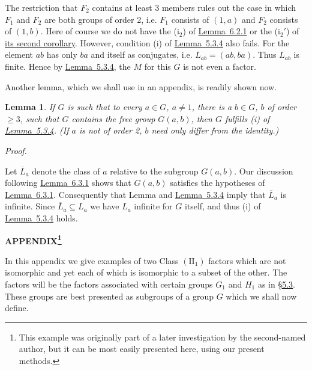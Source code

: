 \documentclass[b5paper,twoside]{article}
\makeatletter
\newcommand{\MvNSetCurrentLabel}[2]{%
  \edef\@currentlabel{#1}%
  \edef\@currentlabelname{#2}%
}
\newcommand{\MvNTargetLabel}[3]{%
  \phantomsection
  \begingroup
    \MvNSetCurrentLabel{#2}{#3}%
    \label{#1}%
  \endgroup
}
\newcommand{\secref}[2]{\hyperref[#1]{\mbox{\S#2}}}
\newcommand{\lemref}[2]{\hyperref[#1]{\mbox{Lemma~#2}}}
\theoremstyle{mvnplain}
\newtheorem{lemma}{Lemma}[section]
\renewenvironment{proof}[1][Proof]{%
  \par\addvspace{0.35\baselineskip}%
  \noindent\textit{#1.}\ \normalfont\ignorespaces
}{%
  \par\addvspace{0.35\baselineskip}%
}
\newcommand{\M}{\mathbf M}
\def\M{M}%
\def\mathfrak#1{#1}%
\makeatother
\begin{document}
The restriction that $\mathfrak F_2$ contains at least 3 members rules out the
case in which $\mathfrak F_1$ and $\mathfrak F_2$ are both groups of order 2,
i.e. $\mathfrak F_1$ consists of $(1,a)$ and $\mathfrak F_2$ consists of
$(1,b)$. Here of course we do not have the (i$_2$) of
\lemref{lem:6.2.1}{6.2.1} or the (i$_2'$) of
\hyperref[cor:6.2.2]{its second corollary}. However,
condition (i) of \lemref{lem:5.3.4}{5.3.4} also fails. For the element $ab$
has only $ba$ and itself as conjugates, i.e. $\mathfrak L_{ab}=(ab,ba)$. Thus
$\mathfrak L_{ab}$ is finite. Hence by \lemref{lem:5.3.4}{5.3.4}, the $\M$
for this $\mathfrak G$ is not even a factor.

Another lemma, which we shall use in an appendix, is readily shown now.
\begin{lemma}\label{lem:6.3.2}
If $\mathfrak G$ is such that to every $a\in\mathfrak G$, $a\ne1$, there is a
$b\in\mathfrak G$, $b$ of order $\geq3$, such that $\mathfrak G$ contains the
free group $\mathfrak G(a,b)$, then $\mathfrak G$ fulfills (i) of
\lemref{lem:5.3.4}{5.3.4}. (If $a$ is not of order 2, $b$ need only differ
from the identity.)
\end{lemma}

\begin{proof}
Let $\overline{\mathfrak L}_a$ denote the class of $a$ relative to the subgroup
$\mathfrak G(a,b)$. Our discussion following \lemref{lem:6.3.1}{6.3.1}
shows that $\mathfrak G(a,b)$ satisfies the hypotheses of
\lemref{lem:6.3.1}{6.3.1}. Consequently that Lemma and
\lemref{lem:5.3.4}{5.3.4} imply that $\overline{\mathfrak L}_a$ is infinite.
Since $\overline{\mathfrak L}_a\subseteq\mathfrak L_a$ we have
$\mathfrak L_a$ infinite for $\mathfrak G$ itself, and thus (i) of
\lemref{lem:5.3.4}{5.3.4} holds.
\end{proof}

\MvNTargetLabel{appendix}{Appendix}{Appendix}
\begin{center}\bfseries\MakeUppercase{Appendix}\footnote{This example was
originally part of a later investigation by the second-named author, but it
can be most easily presented here, using our present methods.}\end{center}

In this appendix we give examples of two Class $(\mathrm{II}_1)$ factors which
are not isomorphic and yet each of which is isomorphic to a subset of the
other. The factors will be the factors associated with certain groups
$\mathfrak G_1$ and $\mathfrak H_1$ as in
\secref{sec:5.3}{5.3}. These groups are best presented as subgroups of a group
$\mathfrak G$ which we shall now define.
\end{document}
